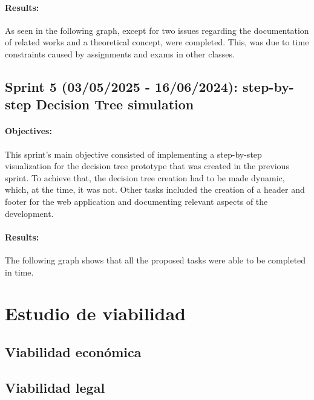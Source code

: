 \paragraph{Results:}
As seen in the following graph, except for two issues regarding the documentation of related works and a theoretical concept, were completed. This, was due to time constraints caused by assignments and exams in other classes.


\subsection{Sprint 5 (03/05/2025 - 16/06/2024): step-by-step Decision Tree simulation}
\paragraph{Objectives:}
This sprint's main objective consisted of implementing a step-by-step visualization for the decision tree prototype that was created in the previous sprint. To achieve that, the decision tree creation had to be made dynamic, which, at the time, it was not. Other tasks included the creation of a header and footer for the web application and documenting relevant aspects of the development.

\paragraph{Results:}
The following graph shows that all the proposed tasks were able to be completed in time.


\section{Estudio de viabilidad}

\subsection{Viabilidad económica}

\subsection{Viabilidad legal}
